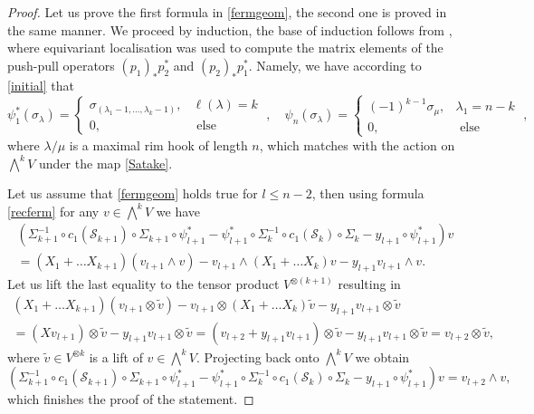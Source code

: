 \documentclass[12pt]{amsart}
\newcommand{\cS}{\mathcal{S}}
\numberwithin{equation}{section}
\numberwithin{figure}{section}
\begin{document}
\begin{proof}
    Let us prove the first formula in \eqref{fermgeom}, the second one is proved in the same manner. We proceed by induction, the base of induction follows from \cite[Prop.4.6]{GKS20}, where equivariant localisation was used to compute the matrix elements of the push-pull operators $(p_1)_* p_2^*$ and $(p_2)_* p_1^*$.  
    Namely, we have according to \eqref{initial} that
    \[
    \psi^*_1(\sigma_\lambda)=\left\{\begin{array}{ll}
    \sigma_{(\lambda_1-1,\ldots,\lambda_k-1)},&\ell(\lambda)=k\\
    0,&\text{ else}
    \end{array}
    \right.\;,\quad
    \psi_n(\sigma_\lambda)=\left\{\begin{array}{ll}
    (-1)^{k-1}\sigma_{\mu},&\lambda_1=n-k\\
    0,&\text{ else}
    \end{array}
    \right.\;,
    \]
    where $\lambda/\mu$ is a maximal rim hook of length $n$, which matches with the action on $\bigwedge^kV$ under the map \eqref{Satake}. 
    
    Let us assume that \eqref{fermgeom} holds true for $l \leq n-2$, then using formula \eqref{recferm} for any $v \in \bigwedge^{k}V$ we have
    \begin{multline*}
    (\Sigma^{-1}_{k + 1} \circ c_1(\cS_{k + 1}) \circ \Sigma_{k + 1}  \circ \psi^*_{l + 1} - \psi^*_{l + 1} \circ \Sigma_k^{-1} \circ c_1(\cS_k) \circ \Sigma_k - y_{l + 1} \circ \psi^{*}_{l + 1})v
    \\
    = (X_1 + \ldots X_{k + 1})(v_{l + 1} \wedge v) - v_{l + 1} \wedge (X_1 + \ldots X_k)v - y_{l + 1} v_{l + 1} \wedge v.
    \end{multline*}
    Let us lift the last equality to the tensor product $V^{\otimes (k + 1)}$ resulting in
    \begin{multline*}
    (X_1 + \ldots X_{k + 1})(v_{l + 1} \otimes \widetilde{v})
    - v_{l + 1} \otimes (X_1 + \ldots X_k) \widetilde{v} - y_{l + 1} v_{l + 1} \otimes \widetilde{v} 
    \\
    = (X v_{l + 1}) \otimes \widetilde{v} - y_{l + 1} v_{l + 1} \otimes \widetilde{v} = (v_{l + 2} + y_{l + 1} v_{l + 1}) \otimes \widetilde{v} - y_{l + 1} v_{l + 1} \otimes \widetilde{v} = v_{l + 2} \otimes \widetilde{v},
    \end{multline*}
    where $\widetilde{v} \in V^{\otimes k}$ is a lift of $v \in \bigwedge^k V$. Projecting back onto $\bigwedge^kV$ we obtain
    \[
    (\Sigma^{-1}_{k + 1} \circ c_1(\cS_{k + 1}) \circ \Sigma_{k + 1}  \circ \psi^*_{l + 1} - \psi^*_{l + 1} \circ \Sigma_k^{-1} \circ c_1(\cS_k) \circ \Sigma_k - y_{l + 1} \circ \psi^{*}_{l + 1})v = v_{l + 2} \wedge v,
    \]
    which finishes the proof of the statement.
\end{proof}
\end{document}
